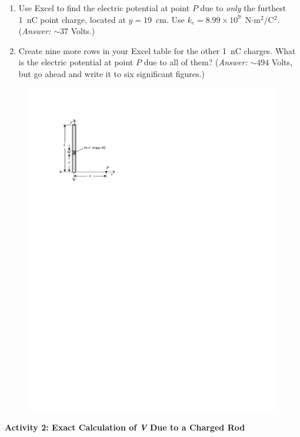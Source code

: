 \begin{enumerate}[labparts]

\item Use Excel to find the electric potential at point $P$ due to \textit{only} the furthest 1~nC point charge, located at $y=19$~cm.  Use $k_e=8.99 \times 10^9$~N$\cdot$m$^2/$C$^2$.  (\textit{Answer:} $\sim 37$ Volts.)
\answerspace{0.5in}

\item Create nine more rows in your Excel table for the other 1~nC charges.  What is the electric potential at point $P$ due to all of them?  (\textit{Answer:} $\sim 494$ Volts, but go ahead and write it to six significant figures.) 
\answerspace{0.5in}

\end{enumerate}

\begin{figure}
\includegraphics[scale=0.9]{potential_charge_distributions/rod_integral.pdf}
\end{figure}
\textbf{Activity 2: Exact Calculation of \textit{V} Due to a Charged Rod}

